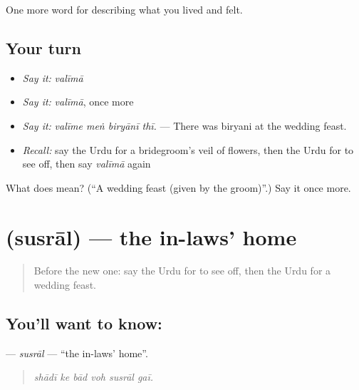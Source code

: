 \begin{grammarlens}[title={What you've built}]
One more word for describing what you lived and felt.
\end{grammarlens}

\subsection*{Your turn}
\begin{itemize}
\raggedright
  \item \emph{Say it:} \emph{valīmā}
  \item \emph{Say it:} \emph{valīmā}, once more
  \item \emph{Say it:} \emph{valīme meṅ biryānī thī.} — There was biryani at the wedding feast.
  \item \emph{Recall:} say the Urdu for a bridegroom's veil of flowers, then the Urdu for to see off, then say \emph{valīmā} again
\end{itemize}

\begin{tcolorbox}[breakable,colback=teal!4,colframe=teal!35!black,title={Before you move on}]
What does  mean? (\textquotedblleft{}A wedding feast (given by the groom)\textquotedblright{}.) Say it once more.
\end{tcolorbox}
\section[\texorpdfstring{\ur{سسرال} (susrāl)}{سسرال (susrāl)}]{ (susrāl) — the in-laws' home}

\label{lesson:UR-C488-susral}



\begin{quote}
Before the new one: say the Urdu for to see off, then the Urdu for a wedding feast.
\end{quote}

\subsection*{You'll want to know: }
\textbf{} — \emph{susrāl} — \textquotedblleft{}the in-laws' home\textquotedblright{}.

\begin{quote}
     
\end{quote}

\begin{quote}
\emph{shādī ke bād voh susrāl gaī.}
\end{quote}


